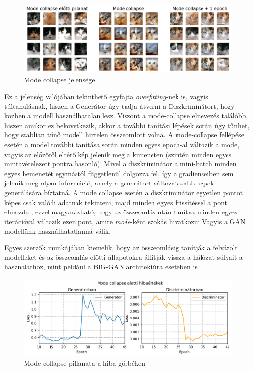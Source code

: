 \begin{figure}[h]
	\centering
	\includegraphics[width=15cm]{images/mode-collapse.png}
	\caption{Mode collapse jelensége}
	\label{fig:mode-collapse}
\end{figure}

Ez a jelenség valójában tekinthető egyfajta \textit{overfitting}-nek is, vagyis túltanulásnak, hiszen a Generátor úgy tudja átverni a Diszkriminátort, hogy közben a modell használhatalan lesz. Viszont a mode-collapse elnevezés találóbb, hiszen amikor ez bekövetkezik, akkor a további tanítási lépések során úgy tűnhet, hogy stablian tűnő modell hirtelen összeomlott volna.
A mode-collapse fellépése esetén a model további tanítása során minden egyes epoch-al változik a mode, vagyis az előzőtől eltérő kép jelenik meg a kimeneten (szintén minden egyes mintavételezett pontra hasonló). Mivel a diszkriminátor a mini-batch minden egyes bemenetét egymástól függetlenül dolgozza fel, így a gradienseiben sem jelenik meg olyan információ, amely a generátort változatosabb képek generálására bíztatná. A mode collapse esetén a diszkriminátor egyetlen pontot képes csak valódi adatnak tekinteni, majd minden egyes frissítéssel a pont elmozdul, ezzel magyarázható, hogy az összeomlás után tanítva minden egyes iterációval változik ezen pont, amire \textit{mode}-ként szokás hivatkozni \cite{salimans2016improved} Vagyis a GAN modellünk használhatatlanná válik.

Egyes szerzők munkájában kiemelik, hogy az összeomlásig tanítják a felvázolt modelleket és az összeomlás előtti állapotokra állítják vissza a hálózat súlyait a használathoz, mint például a BIG-GAN architektúra esetében is \cite{brock2018large}.

\begin{figure}[h]
	\centering
	\includegraphics[width=15cm]{images/mode_collapse_loss.png}
	\caption{Mode collapse pillanata a hiba görbéken}
	\label{fig:mode_collapse_loss}
\end{figure}

